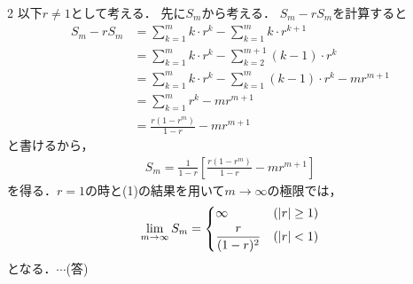 \documentclass[../../main.tex]{subfiles}
\begin{document}
\begin{multicols}{2}
  以下$r\neq 1$として考える．
  先に$S_m$から考える．
  $S_m - rS_m$を計算すると
  \begin{align*}
    S_m - rS_m
     & =  \sum_{k=1}^m k \cdot r^k -  \sum_{k=1}^m k \cdot r^{k+1}               \\
     & =  \sum_{k=1}^m k \cdot r^k -  \sum_{k=2}^{m+1} (k-1) \cdot r^{k}         \\
     & =  \sum_{k=1}^m k \cdot r^k -  \sum_{k=1}^{m} (k-1) \cdot r^{k} -mr^{m+1} \\
     & =  \sum_{k=1}^m r^k -mr^{m+1}                                             \\
     & =  \frac{r(1-r^m)}{1-r} -mr^{m+1}
  \end{align*}
  と書けるから，
  \begin{align*}
    S_m  = \frac{1}{1-r}\left[\frac{r(1-r^m)}{1-r} -mr^{m+1}\right]
  \end{align*}
  を得る．$r=1$の時と(1)の結果を用いて$m\to\infty$の極限では，
  \begin{align}
    \lim_{m\to\infty}S_m =
    \begin{dcases}
      \infty            & (|r| \ge 1) \\
      \frac{r}{(1-r)^2} & (|r| < 1)
    \end{dcases}\label{2005-1:eq:2}
  \end{align}
  となる．$\cdots$(答)


\end{multicols}
\end{document}
